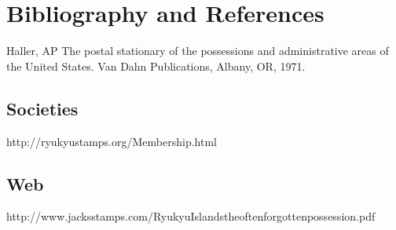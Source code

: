 
\chapter{Bibliography and References}  

Haller, AP The postal stationary of the possessions and administrative areas 
of the United States. Van Dahn Publications, Albany, OR, 1971. 


\section{Societies}

http://ryukyustamps.org/Membership.html  

\section{Web}

http://www.jacksstamps.com/RyukyuIslandstheoftenforgottenpossession.pdf  